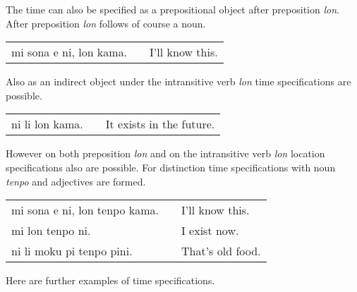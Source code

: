 The time can also be specified as a prepositional object after preposition \textit{lon}.
After preposition \textit{lon} follows of course a noun.

\begin{supertabular}{p{5,5cm}|ll}
    mi sona e ni, lon kama. &  & I'll know this. \\
\end{supertabular}

Also as an indirect object under the intransitive verb \textit{lon} time specifications are possible.

\begin{supertabular}{p{5,5cm}|ll}
    ni li lon kama. &  & It exists in the future. \\
\end{supertabular}

However on both preposition \textit{lon} and on the intransitive verb \textit{lon} location specifications also are possible.
For distinction time specifications with noun \textit{tenpo} and adjectives are formed.

\begin{supertabular}{p{5,5cm}|ll}
    mi sona e ni, lon tenpo kama. &  & I'll know this.  \\
    mi lon tenpo ni.              &  & I exist now.     \\
    ni li moku pi tenpo pini.     &  & That's old food. \\
\end{supertabular}

Here are further examples of time specifications.

